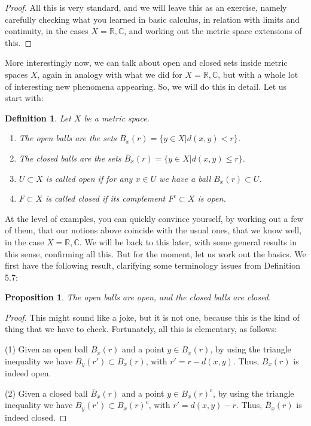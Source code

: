 \documentclass[12pt]{amsbook}
\newtheorem{definition}[theorem]{Definition}
\newtheorem{proposition}[theorem]{Proposition}
\begin{document}
\begin{proof}
All this is very standard, and we will leave this as an exercise, namely carefully checking what you learned in basic calculus, in relation with limits and continuity, in the cases $X=\mathbb R,\mathbb C$, and working out the metric space extensions of this.
\end{proof}

More interestingly now, we can talk about open and closed sets inside metric spaces $X$, again in analogy with what we did for $X=\mathbb R,\mathbb C$, but with a whole lot of interesting new phenomena appearing. So, we will do this in detail. Let us start with:

\begin{definition}
Let $X$ be a metric space.
\begin{enumerate}
\item The open balls are the sets $B_x(r)=\{y\in X|d(x,y)<r\}$.

\item The closed balls are the sets $\bar{B}_x(r)=\{y\in X|d(x,y)\leq r\}$.

\item $U\subset X$ is called open if for any $x\in U$ we have a ball $B_x(r)\subset U$.

\item $F\subset X$ is called closed if its complement $F^c\subset X$ is open.
\end{enumerate}
\end{definition}

At the level of examples, you can quickly convince yourself, by working out a few of them, that our notions above coincide with the usual ones, that we know well, in the case $X=\mathbb R,\mathbb C$. We will be back to this later, with some general results in this sense, confirming all this. But for the moment, let us work out the basics. We first have the following result, clarifying some terminology issues from Definition 5.7:

\begin{proposition}
The open balls are open, and the closed balls are closed.
\end{proposition}

\begin{proof}
This might sound like a joke, but it is not one, because this is the kind of thing that we have to check. Fortunately, all this is elementary, as follows:

\medskip

(1) Given an open ball $B_x(r)$ and a point $y\in B_x(r)$, by using the triangle inequality we have $B_y(r')\subset B_x(r)$, with $r'=r-d(x,y)$. Thus, $B_x(r)$ is indeed open.

\medskip

(2) Given a closed ball $\bar{B}_x(r)$ and a point $y\in B_x(r)^c$, by using the triangle inequality we have $B_y(r')\subset B_x(r)^c$, with $r'=d(x,y)-r$. Thus, $\bar{B}_x(r)$ is indeed closed.
\end{proof}
\end{document}
